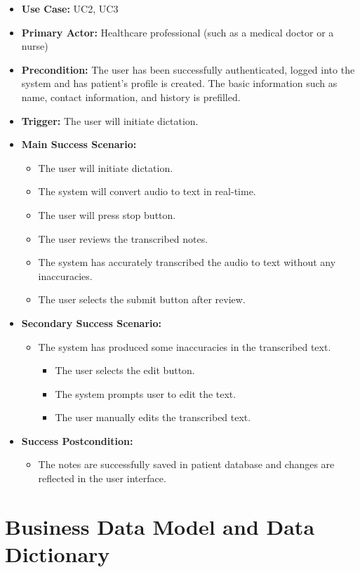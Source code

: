 \documentclass[12pt]{article}
\begin{document}
\begin{itemize}
  \item\textbf{Use Case:} UC2, UC3
  \item\textbf{Primary Actor:} Healthcare professional (such as a medical doctor or a nurse)
  \item\textbf{Precondition:} The user has been successfully authenticated, logged into the system and has patient's profile is created. The basic information such as name, contact information, and history is prefilled.
  \item\textbf{Trigger:} The user will initiate dictation.
  \item\textbf{Main Success Scenario:}
  \begin{itemize}
    \item The user will initiate dictation.
    \item The system will convert audio to text in real-time.
    \item The user will press stop button.
    \item The user reviews the transcribed notes. 
    \item The system has accurately transcribed the audio to text without any inaccuracies.
    \item The user selects the submit button after review. 
  \end{itemize}
  \item\textbf{Secondary Success Scenario:}
  \begin{itemize}
    \item The system has produced some inaccuracies in the transcribed text.
    \begin{itemize}
      \item The user selects the edit button.
      \item The system prompts user to edit the text.
      \item The user manually edits the transcribed text.
    \end{itemize} 
  \end{itemize}
  \item\textbf{Success Postcondition:}
  \begin{itemize}
    \item The notes are successfully saved in patient database and changes are reflected in the user interface.
  \end{itemize}
\end{itemize}

\section{Business Data Model and Data Dictionary}
\end{document}
